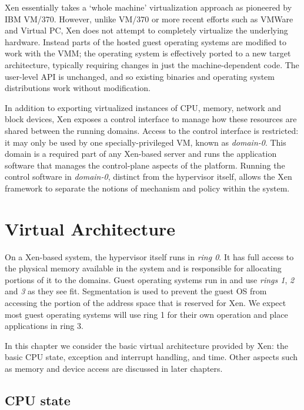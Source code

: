 \documentclass[11pt,twoside,final,openright]{xenstyle}
\begin{document}
Xen essentially takes a `whole machine' virtualization approach as
pioneered by IBM VM/370.  However, unlike VM/370 or more recent
efforts such as VMWare and Virtual PC, Xen does not attempt to
completely virtualize the underlying hardware.  Instead parts of the
hosted guest operating systems are modified to work with the VMM; the
operating system is effectively ported to a new target architecture,
typically requiring changes in just the machine-dependent code.  The
user-level API is unchanged, and so existing binaries and operating
system distributions work without modification.

In addition to exporting virtualized instances of CPU, memory, network
and block devices, Xen exposes a control interface to manage how these
resources are shared between the running domains. Access to the
control interface is restricted: it may only be used by one
specially-privileged VM, known as {\em domain-0}.  This domain is a
required part of any Xen-based server and runs the application software
that manages the control-plane aspects of the platform.  Running the
control software in {\it domain-0}, distinct from the hypervisor
itself, allows the Xen framework to separate the notions of 
mechanism and policy within the system.



\chapter{Virtual Architecture}

On a Xen-based system, the hypervisor itself runs in {\it ring 0}.  It
has full access to the physical memory available in the system and is
responsible for allocating portions of it to the domains.  Guest
operating systems run in and use {\it rings 1}, {\it 2} and {\it 3} as
they see fit. Segmentation is used to prevent the guest OS from
accessing the portion of the address space that is reserved for
Xen. We expect most guest operating systems will use ring 1 for their
own operation and place applications in ring 3.

In this chapter we consider the basic virtual architecture provided 
by Xen: the basic CPU state, exception and interrupt handling, and
time. Other aspects such as memory and device access are discussed 
in later chapters. 

\section{CPU state}
\end{document}
